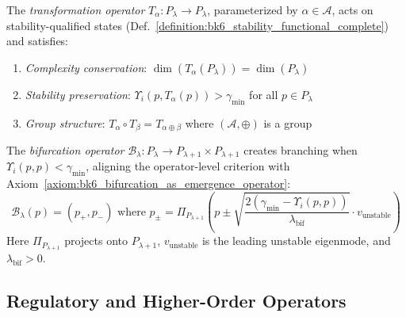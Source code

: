 \begin{definition}
\label{definition:bk6_transformation_operator_complete}
The \emph{transformation operator} $T_\alpha : P_{\lambda} \to P_{\lambda}$, parameterized by $\alpha \in \mathcal{A}$, acts on stability-qualified states (Def.~\ref{definition:bk6_stability_functional_complete}) and satisfies:
\begin{enumerate}
\item \emph{Complexity conservation}: $\dim(T_\alpha(P_{\lambda})) = \dim(P_{\lambda})$
\item \emph{Stability preservation}: $\Upsilon_i(p, T_\alpha(p)) > \gamma_{\min}$ for all $p \in P_{\lambda}$
\item \emph{Group structure}: $T_\alpha \circ T_\beta = T_{\alpha \oplus \beta}$ where $(\mathcal{A}, \oplus)$ is a group
\end{enumerate}
\end{definition}

\begin{definition}
\label{definition:bk6_bifurcation_operator_complete}
The \emph{bifurcation operator} $\mathcal{B}_\lambda : P_\lambda \to P_{\lambda+1} \times P_{\lambda+1}$ creates branching when $\Upsilon_i(p,p) < \gamma_{\min}$, aligning the operator-level criterion with Axiom~\ref{axiom:bk6_bifurcation_as_emergence_operator}:
\begin{equation}
\mathcal{B}_\lambda(p) = (p_+, p_-) \text{ where } p_\pm = \Pi_{P_{\lambda+1}}\left(p \pm \sqrt{\frac{2(\gamma_{\min} - \Upsilon_i(p,p))}{\lambda_{\text{bif}}}} \cdot v_{\text{unstable}}\right)
\end{equation}
Here $\Pi_{P_{\lambda+1}}$ projects onto $P_{\lambda+1}$, $v_{\text{unstable}}$ is the leading unstable eigenmode, and $\lambda_{\text{bif}} > 0$.
\end{definition}

\subsection{Regulatory and Higher-Order Operators}
\label{subsec:bk6_regulatory_higher_order_operators}

